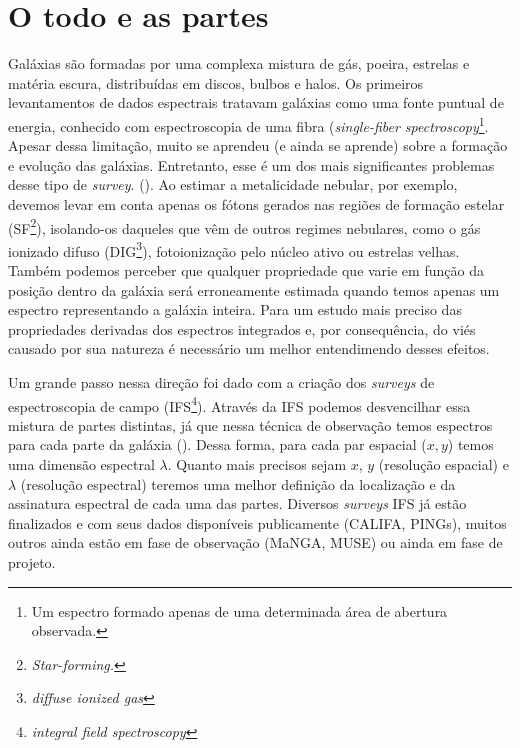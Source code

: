 \section{O todo e as partes}
\label{sec:intro:}

Galáxias são formadas por uma complexa mistura de gás, poeira, estrelas e matéria escura, distribuídas em discos, bulbos e halos. Os primeiros levantamentos de dados espectrais tratavam galáxias como uma fonte puntual de energia, conhecido com espectroscopia de uma fibra ({\em single-fiber spectroscopy}\footnote{Um espectro formado apenas de uma determinada área de abertura observada.}. Apesar dessa limitação, muito se aprendeu (e ainda se aprende) sobre a formação e evolução das galáxias. Entretanto, esse é um dos mais significantes problemas desse tipo de {\em survey}. (). Ao estimar a metalicidade nebular, por exemplo, devemos levar em conta apenas os fótons gerados nas regiões de formação estelar (SF\footnote{{\em Star-forming.}}), isolando-os daqueles que vêm de outros regimes nebulares, como o gás ionizado difuso (DIG\footnote{{\em diffuse ionized gas}}), fotoionização pelo núcleo ativo ou estrelas velhas. Também podemos perceber que qualquer propriedade que varie em função da posição dentro da galáxia será erroneamente estimada quando temos apenas um espectro representando a galáxia inteira. Para um estudo mais preciso das propriedades derivadas dos espectros integrados e, por consequência, do viés causado por sua natureza é necessário um melhor entendimendo desses efeitos.

Um grande passo nessa direção foi dado com a criação dos {\em surveys} de espectroscopia de campo (IFS\footnote{{\em integral field spectroscopy}}). Através da IFS podemos desvencilhar essa mistura de partes distintas, já que nessa técnica de observação temos espectros para cada parte da galáxia (). Dessa forma, para cada par espacial ($x,y$) temos uma dimensão espectral $\lambda$. Quanto mais precisos sejam $x$, $y$ (resolução espacial) e $\lambda$ (resolução espectral) teremos uma melhor definição da localização e da assinatura espectral de cada uma das partes. Diversos {\em surveys} IFS já estão finalizados e com seus dados disponíveis publicamente ({\ATR CALIFA, PINGs}), muitos outros ainda estão em fase de observação ({\ATR MaNGA, MUSE}) ou ainda em fase de projeto.















